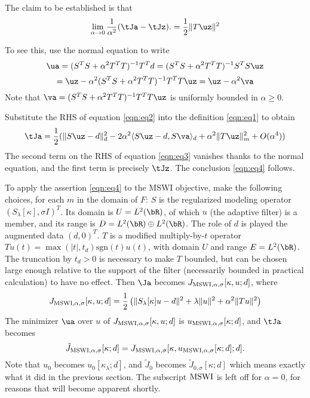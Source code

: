 The claim to be established is that
\begin{equation}
  \label{eqn:eq4}
  \lim_{\alpha \rightarrow 0} \frac{1}{\alpha^2}  (\tJa-\tJz).= \frac{1}{2}\|T\uz\|^2
\end{equation}

To see this, use the normal equation to write
\[
  \ua = (S^TS + \alpha^2 T^TT)^{-1}T^Td = (S^TS + \alpha^2 T^TT)^{-1}S^TS \uz
\]
\begin{equation}
  \label{eqn:eq2}
  = \uz - \alpha^2 (S^TS + \alpha^2 T^TT)^{-1}T^TT\uz = \uz-\alpha^2 \va
\end{equation}
Note that $\va = (S^TS + \alpha^2 T^TT)^{-1}T^TT\uz$ is uniformly bounded in $\alpha \ge 0$.

Substitute the RHS of equation \ref{eqn:eq2} into the definition \ref{eqn:eq1} to obtain
\begin{equation}
  \label{eqn:eq3}
  \tJa = \frac{1}{2}(\|S\uz-d\|_d^2 - 2 \alpha^2\langle S\uz-d, S\va\rangle_d + \alpha^2\|T\uz\|_m^2 + O(\alpha^4))
\end{equation}
The second term on the RHS of equation \ref{eqn:eq3} vanishes thanks to the normal equation, and the first term is precisely $\tJz$. The conclusion \ref{eqn:eq4} follows.

To apply the assertion \ref{eqn:eq4} to the MSWI objective, make the
following choices, for each $m$ in the domain of $F$: $S$ is the regularized
modeling operator $(S_{\lambda}[\kappa],\sigma I)^T$.  Its domain is $U=L^2(\bR)$, of
which $u$ (the adaptive filter) is a member, and 
its range is $D = L^2(\bR) \oplus
L^2(\bR)$. The role of $d$ is played  the
augmented data $(d,0)^T$. $T$ is a modified multiply-by-$t$ operator
$Tu(t)=\max(|t|, t_d) \mbox{sgn}(t)u(t)$, with domain $U$ and
range $E=L^2(\bR)$. The truncation by $t_d > 0$ is necessary
to make $T$ bounded, but can be chosen large enough relative to the
support of the filter (necessarily bounded in practical calculation)
to have no effect. Then $\Ja$ becomes $J_{{\rm MSWI},\alpha,\sigma}[\kappa,u;d]$, where
\begin{equation}
  \label{eqn:eq5}
   J_{{\rm MSWI},\alpha,\sigma}[\kappa,u;d] = \frac{1}{2}\left(\|S_{\lambda}[\kappa]u-d\|^2 +
   \lambda\|u\|^2 + \alpha^2\|Tu\|^2\right)
 \end{equation}
The minimizer $\ua$ over $u$ of $ J_{{\rm MSWI}, \alpha,\sigma}[\kappa,u;d]$ is
$u_{{\rm MSWI},\alpha,\sigma}[\kappa;d]$, and $\tJa$ becomes
\begin{equation}
  \label{eqn:eq6}
  \tilde{J}_{{\rm MSWI},\alpha,\sigma}[\kappa;d] =
  J_{{\rm MSWI},\alpha,\sigma}[\kappa,u_{{\rm MSWI},\alpha,\sigma}[\kappa;d];d].
\end{equation}
Note that $u_0$ becomes $u_0[\kappa_{\lambda};d]$, and $\tilde{J}_0$ becomes
$\tilde{J}_{0,\sigma}[\kappa;d]$ which means exactly what
it did in the previous section. The subscript ${\rm MSWI}$ is left
off for $\alpha=0$, for reasons that will become apparent shortly.

